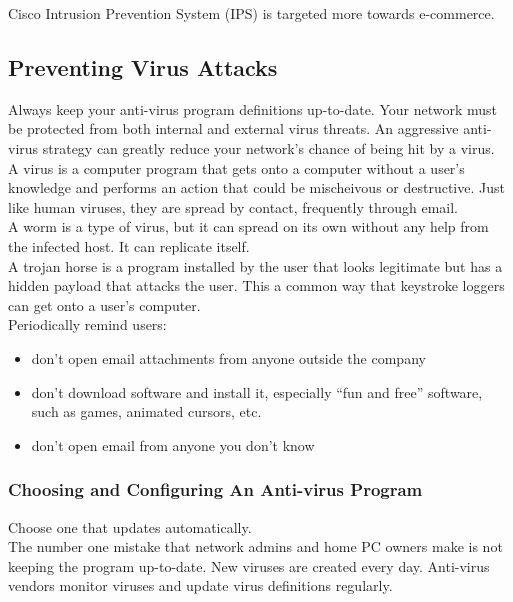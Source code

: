 Cisco Intrusion Prevention System (IPS) is targeted more towards e-commerce.

\subsection{Preventing Virus Attacks}

Always keep your anti-virus program definitions up-to-date. Your network
must be protected from both internal and external virus threats. An
aggressive anti-virus strategy can greatly reduce your network's chance
of being hit by a virus.\\

A virus is a computer program that gets onto a computer without a user's
knowledge and performs an action that could be mischeivous or destructive.
Just like human viruses, they are spread by contact, frequently through
email.\\

A worm is a type of virus, but it can spread on its own without any help
from the infected host. It can replicate itself.\\

A trojan horse is a program installed by the user that looks legitimate
but has a hidden payload that attacks the user. This a common way that
keystroke loggers can get onto a user's computer.\\

Periodically remind users:

\begin{itemize}

\item don't open email attachments from anyone outside the company

\item don't download software and install it, especially ``fun and free''
software, such as games, animated cursors, etc.

\item don't open email from anyone you don't know

\end{itemize}

\subsubsection{Choosing and Configuring An Anti-virus Program}

Choose one that updates automatically.\\

The number one mistake that network admins and home PC owners make is not
keeping the program up-to-date. New viruses are created every day. Anti-virus
vendors monitor viruses and update virus definitions regularly.\\


